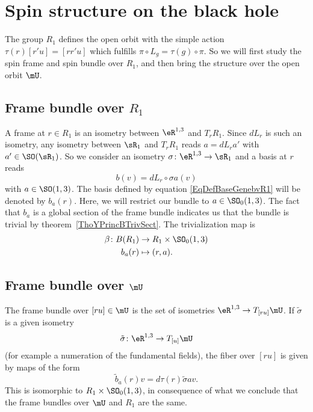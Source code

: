 \section{Spin structure on the black hole}

The group $R_1$ defines the open orbit with the simple action $\tau(r)[r'u]=[rr'u]$ which fulfills $\pi\circ L_g=\tau(g)\circ\pi$. So we will first study the spin frame and spin bundle over $R_1$, and then bring the structure over the open orbit $\mU$.

\subsection{Frame bundle over \texorpdfstring{$R_1$}{R1}}

A frame at $r\in R_1$ is an isometry between $\eR^{1,3}$ and $T_rR_1$. Since $dL_r$ is such an isometry, any isometry between $\sR_1$ and $T_rR_1$ reads $a=dL_ra'$ with $a'\in\SO(\sR_1)$. So we consider an isometry $\sigma\colon \eR^{1,3}\to \sR_1$ and a basis at $r$ reads
\begin{equation}   \label{EqDefBaseGenebvR1}
    b(v)=dL_r\circ\sigma a(v)
\end{equation}
with $a\in \SO(1,3)$. The basis defined by equation \eqref{EqDefBaseGenebvR1} will be denoted by $b_a(r)$. Here, we will restrict our bundle to $a\in \SO_0(1,3)$. The fact that $b_a$ is a global section of the frame bundle indicates us that the bundle is trivial by theorem~\ref{ThoYPrincBTrivSect}. The trivialization map is
\begin{equation}
\begin{aligned}
 \beta\colon B(R_1)&\to R_1\times \SO_0(1,3) \\
b_a(r)&\mapsto (r,a).
\end{aligned}
\end{equation}


\subsection{Frame bundle over \texorpdfstring{$\mU$}{U}}

The frame bundle over $[ru]\in \mU$ is the set of isometries $\eR^{1,3}\to T_{[ru]}\mU$. If $\tilde\sigma$ is a given isometry
\[
  \tilde\sigma\colon \eR^{1,3}\to T_{[u]}\mU
\]
(for example a numeration of the fundamental fields), the fiber over $[ru]$ is given by maps of the form
\begin{equation}
\tilde b_a(r)v=d\tau(r)\tilde\sigma av.
\end{equation}
This is isomorphic to $R_1\times\SO_0(1,3)$, in consequence of what we conclude that the frame bundles over $\mU$ and $R_1$ are the same.
